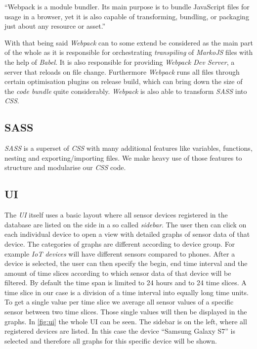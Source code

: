“Webpack is a module bundler. Its main purpose is to bundle JavaScript files for usage in a browser,
yet it is also capable of transforming, bundling, or packaging just about any resource or asset.”
\cite{webpack}

With that being said \textit{Webpack} can to some extend be considered as the main part of the whole
 as it is responsible for orchestrating \textit{transpiling} of
\textit{MarkoJS} files with the help of \textit{Babel}. It is also responsible for providing
\textit{Webpack Dev Server}, a server that reloads on file change. Furthermore \textit{Webpack} runs
all files through certain optimisation plugins on release build, which can bring down the size of
the \textit{code bundle} quite considerably. \textit{Webpack} is also able to transform
\textit{SASS} into \textit{CSS}.

\subsection{SASS}

\textit{SASS} \cite{sass} is a superset of \textit{CSS} with many additional features like
variables, functions, nesting and exporting/importing files. We make heavy use of those features to
structure and modularise our \textit{CSS} code.

\subsection{UI}
\label{sec:ui}

The \textit{UI} itself uses a basic layout where all sensor devices registered in the database are
listed on the side in a so called \textit{sidebar}. The user then can click on each individual
device to open a view with detailed graphs of sensor data of that device. The categories of graphs
are different according to device group. For example \textit{IoT devices} will have different
sensors compared to phones. After a device is selected, the user can then specify the begin, end
time interval and the amount of time slices according to which sensor data of that device will be
filtered. By default the time span is limited to 24 hours and to 24 time slices. A time slice in our
case is a division of a time interval into equally long time units. To get a single value per time
slice we average all sensor values of a specific sensor between two time slices. Those single values
will then be displayed in the graphs. In \ref{fig:ui} the whole UI can be seen. The sidebar is on
the left, where all registered devices are listed. In this case the device “Samsung Galaxy S7” is
selected and therefore all graphs for this specific device will be shown.

